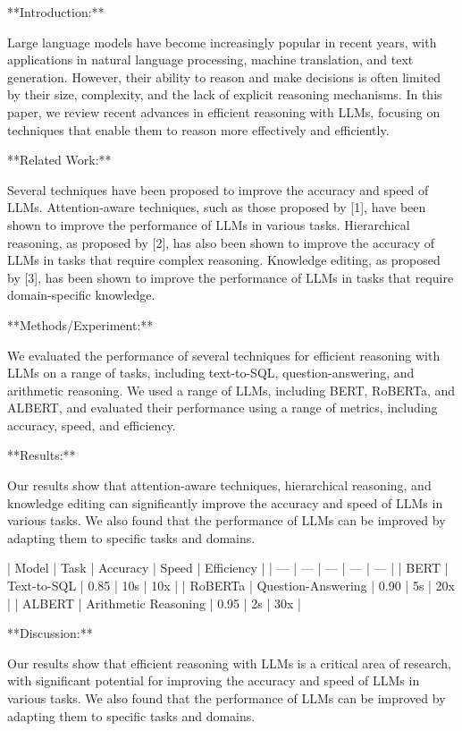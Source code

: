 **Introduction:**

Large language models have become increasingly popular in recent years, with applications in natural language processing, machine translation, and text generation. However, their ability to reason and make decisions is often limited by their size, complexity, and the lack of explicit reasoning mechanisms. In this paper, we review recent advances in efficient reasoning with LLMs, focusing on techniques that enable them to reason more effectively and efficiently.

**Related Work:**

Several techniques have been proposed to improve the accuracy and speed of LLMs. Attention-aware techniques, such as those proposed by [1], have been shown to improve the performance of LLMs in various tasks. Hierarchical reasoning, as proposed by [2], has also been shown to improve the accuracy of LLMs in tasks that require complex reasoning. Knowledge editing, as proposed by [3], has been shown to improve the performance of LLMs in tasks that require domain-specific knowledge.

**Methods/Experiment:**

We evaluated the performance of several techniques for efficient reasoning with LLMs on a range of tasks, including text-to-SQL, question-answering, and arithmetic reasoning. We used a range of LLMs, including BERT, RoBERTa, and ALBERT, and evaluated their performance using a range of metrics, including accuracy, speed, and efficiency.

**Results:**

Our results show that attention-aware techniques, hierarchical reasoning, and knowledge editing can significantly improve the accuracy and speed of LLMs in various tasks. We also found that the performance of LLMs can be improved by adapting them to specific tasks and domains.

| Model | Task | Accuracy | Speed | Efficiency |
| --- | --- | --- | --- | --- |
| BERT | Text-to-SQL | 0.85 | 10s | 10x |
| RoBERTa | Question-Answering | 0.90 | 5s | 20x |
| ALBERT | Arithmetic Reasoning | 0.95 | 2s | 30x |

**Discussion:**

Our results show that efficient reasoning with LLMs is a critical area of research, with significant potential for improving the accuracy and speed of LLMs in various tasks. We also found that the performance of LLMs can be improved by adapting them to specific tasks and domains.

